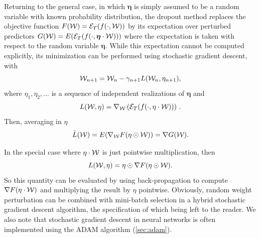 Returning to the general case, in which $\boldsymbol\eta$ is simply assumed to be a random variable with known probability distribution, the dropout method replaces the objective function $F({\mathcal W}) = {\mathcal E}_T(f(\cdot, {\mathcal W}))$ by its expectation over perturbed predictors
$G({\mathcal W}) = E({\mathcal E}_T(f(\cdot, \bm\eta\cdot{\mathcal W})))$ where the expectation is taken with respect to the random variable $\boldsymbol\eta$.  While this expectation cannot be computed explicitly, its minimization can be performed using stochastic gradient descent, with
\[
{\mathcal W}_{n+1} = {\mathcal W}_n - \gamma_{n+1}  L({\mathcal W}_n, \eta_{n+1}),
\]
where $\eta_1, \eta_2, \ldots$ is a sequence of independent realizations of $\boldsymbol\eta$ and 
\[
L({\mathcal W}, \eta) = \nabla_{{\mathcal W}} \left({\mathcal E}_T(f(\cdot, \eta\cdot{\mathcal W}))\right)\,.
\]
Then, averaging in $\eta$
\[
\bar L({\mathcal W}) = E(\nabla_{{\mathcal W}} F(\eta\odot{\mathcal W})) = \nabla G({\mathcal W}).
\]

In the special case where $\eta\cdot{\mathcal W}$ is just pointwise multiplication, then
\[
L({\mathcal W}, \eta) = \eta\odot \nabla F(\eta\odot{\mathcal W}).
\]
So this quantity can be evaluated by using back-propagation to compute $\nabla F(\eta\cdot{\mathcal W})$ and multiplying the result  by $\eta$ pointwise. Obviously, random weight perturbation can be combined with mini-batch selection in a hybrid stochastic gradient descent algorithm, the specification of which being left to the reader. We also note that stochastic gradient descent in neural networks is often implemented using the ADAM algorithm  (\cref{sec:adam}). 

